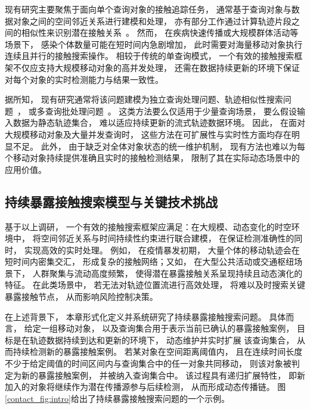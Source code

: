 现有研究主要聚焦于面向单个查询对象的接触追踪任务， 通常基于查询对象与数据对象之间的空间邻近关系进行建模和处理， 亦有部分工作通过计算轨迹片段之间的相似性来识别潜在接触关系~。 然而， 在疾病快速传播或大规模群体活动等场景下， 感染个体数量可能在短时间内急剧增加， 此时需要对海量移动对象执行连续且并行的接触搜索操作。 相较于传统的单查询模式， 一个有效的接触搜索框架不仅应支持大规模移动对象的高并发处理， 还需在数据持续更新的环境下保证对每个对象的实时检测能力与结果一致性。

据所知， 现有研究通常将该问题建模为独立查询处理问题、轨迹相似性搜索问题~， 或多查询批处理问题~。 这类方法要么仅适用于少量查询场景， 要么假设输入数据为静态轨迹集合， 难以适应持续更新的流式轨迹数据环境。 因此， 在面对大规模移动对象及大量并发查询时， 这些方法在可扩展性与实时性方面均存在明显不足。 此外， 由于缺乏对全体对象状态的统一维护机制， 现有方法也难以为每个移动对象持续提供准确且实时的接触检测结果， 限制了其在实际动态场景中的应用价值。



\subsection{持续暴露接触搜索模型与关键技术挑战}
基于以上调研， 一个有效的接触搜索框架应满足：在大规模、动态变化的时空环境中， 将空间邻近关系与时间持续性约束进行联合建模， 在保证检测准确性的同时， 实现高效的实时处理。 例如， 在疫情暴发初期， 大量个体的移动轨迹会在短时间内密集交汇， 形成复杂的接触网络；又如， 在大型公共活动或交通枢纽场景下， 人群聚集与流动高度频繁， 使得潜在暴露接触关系呈现持续且动态演化的特征。 在此类场景中， 若无法对轨迹位置流进行高效处理， 将难以及时搜索关键暴露接触节点， 从而影响风险控制决策。

在上述背景下， 本章形式化定义并系统研究了持续暴露接触搜索问题。 具体而言， 给定一组移动对象， 以及查询集合用于表示当前已确认的暴露接触案例， 目标是在轨迹数据持续到达和更新的环境下， 动态维护并实时扩展 该查询集合， 从而持续检测新的暴露接触案例。 若某对象在空间距离阈值内， 且在连续时间长度不少于给定阈值的时间区间内与查询集合中的任一对象共同移动， 则该对象被判定为新的暴露接触案例， 并被纳入查询集合中。 该过程具有递归扩展特性， 即新加入的对象将继续作为潜在传播源参与后续检测， 从而形成动态传播链。 图\ref{contact_fig:intro}给出了持续暴露接触搜索问题的一个示例。

